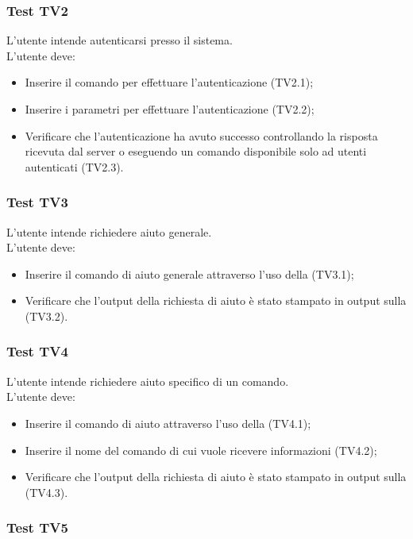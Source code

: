 \documentclass{scalatekids-article}
\begin{document}
\subsubsection{Test TV2}

L'utente intende autenticarsi presso il sistema.\\
L'utente deve:
\begin{itemize}
\item Inserire il comando per effettuare l'autenticazione (TV2.1);
\item Inserire i parametri per effettuare l'autenticazione (TV2.2);
\item Verificare che l'autenticazione ha avuto successo controllando la 
risposta ricevuta dal server o eseguendo un comando 
disponibile solo ad utenti autenticati (TV2.3).
\end{itemize}

\subsubsection{Test TV3}
\label{sec:TV3}

L'utente intende richiedere aiuto generale.\\
L'utente deve:
\begin{itemize}
\item Inserire il comando di aiuto generale attraverso l'uso della  (TV3.1);
\item Verificare che l'output della richiesta di aiuto è stato stampato in 
output sulla  (TV3.2).
\end{itemize}

\subsubsection{Test TV4}
\label{sec:TV4}

L'utente intende richiedere aiuto specifico di un comando.\\
L'utente deve:
\begin{itemize}
\item Inserire il comando di aiuto attraverso l'uso della  (TV4.1);
\item Inserire il nome del comando di cui vuole ricevere informazioni (TV4.2);
\item Verificare che l'output della richiesta di aiuto è stato stampato in 
output sulla  (TV4.3).
\end{itemize}

\subsubsection{Test TV5}
\end{document}
